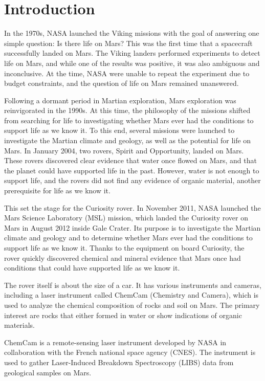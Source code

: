 \section{Introduction}\label{sec:introduction}
In the 1970s, NASA launched the Viking missions with the goal of answering one simple question: Is there life on Mars?
This was the first time that a spacecraft successfully landed on Mars.
The Viking landers performed experiments to detect life on Mars, and while one of the results was positive, it was also ambiguous and inconclusive.
At the time, NASA were unable to repeat the experiment due to budget constraints, and the question of life on Mars remained unanswered.\cite{marsnasagov_vikings}

Following a dormant period in Martian exploration, Mars exploration was reinvigorated in the 1990s.
At this time, the philosophy of the missions shifted from searching for life to investigating whether Mars ever had the conditions to support life as we know it.
To this end, several missions were launched to investigate the Martian climate and geology, as well as the potential for life on Mars.
In January 2004, two rovers, Spirit and Opportunity, landed on Mars.
These rovers discovered clear evidence that water once flowed on Mars, and that the planet could have supported life in the past.
However, water is not enough to support life, and the rovers did not find any evidence of organic material, another prerequisite for life as we know it.\cite{marsnasagov_observer}\cite{marsnasagov_spirit_opportunity}

This set the stage for the Curiosity rover.
In November 2011, NASA launched the Mars Science Laboratory (MSL) mission, which landed the Curiosity rover on Mars in August 2012 inside Gale Crater.
Its purpose is to investigate the Martian climate and geology and to determine whether Mars ever had the conditions to support life as we know it.
Thanks to the equipment on board Curiosity, the rover quickly discovered chemical and mineral evidence that Mars once had conditions that could have supported life as we know it.\cite{chemcamNasaWebsite}

The rover itself is about the size of a car.
It has various instruments and cameras, including a laser instrument called ChemCam (Chemistry and Camera), which is used to analyze the chemical composition of rocks and soil on Mars.
The primary interest are rocks that either formed in water or show indications of organic materials.\cite{chemcamNasaWebsite}

ChemCam is a remote-sensing laser instrument developed by NASA in collaboration with the French national space agency (CNES).
The instrument is used to gather Laser-Induced Breakdown Spectroscopy (LIBS) data from geological samples on Mars.

